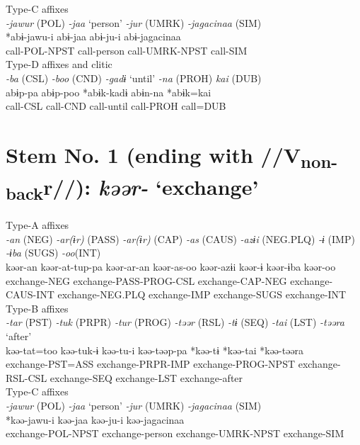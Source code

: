 \ex Type-C affixes\\
\glll \textit{-jawur} (POL)  \textit{-jaa} ‘person’  \textit{-jur} (UMRK)  \textit{-jagacinaa} (SIM)\\
*abɨ-jawu-i  abɨ-jaa  abɨ-ju-i  abɨ-jagacinaa\\
call-POL-NPST  call-person  call-UMRK-NPST  call-SIM\\


\ex Type-D affixes and clitic\\
\glll \textit{-ba} (CSL)  \textit{-boo} (CND)  \textit{-gadɨ} ‘until’  \textit{-na} (PROH)  \textit{kai} (DUB)\\
abɨp-pa  abɨp-poo  *abɨk-kadɨ  abɨn-na  *abɨk=kai\\
call-CSL  call-CND  call-until  call-PROH  call=DUB\\
\z

\section{Stem No. 1 (ending with //V\textsubscript{non-back}r//): \textit{kəər-} ‘exchange’}


\ea Type-A affixes\\
\glll \textit{-an} (NEG)  \textit{-ar(ɨr)} (PASS)  \textit{-ar(ɨr)} (CAP)  \textit{-as} (CAUS)  \textit{-azɨi} (NEG.PLQ)  \textit{-ɨ} (IMP)  \textit{-ɨba} (SUGS)  \textit{-oo}(INT)\\
kəər-an  kəər-at-tup-pa  kəər-ar-an  kəər-as-oo  kəər-azɨi  kəər-ɨ  kəər-ɨba  kəər-oo\\
exchange-NEG  exchange-PASS-PROG-CSL  exchange-CAP-NEG  exchange-CAUS-INT  exchange-NEG.PLQ  exchange-IMP  exchange-SUGS  exchange-INT\\


\ex Type-B affixes\\
\glll \textit{-tar} (PST)  \textit{-tuk} (PRPR)  \textit{-tur} (PROG)  \textit{-təər} (RSL)  \textit{-tɨ} (SEQ)  \textit{-tai} (LST)  \textit{-təəra} ‘after’\\
kəə-tat=too  kəə-tuk-ɨ  kəə-tu-i  kəə-təəp-pa  *kəə-tɨ  *kəə-tai  *kəə-təəra\\
exchange-PST=ASS  exchange-PRPR-IMP  exchange-PROG-NPST  exchange-RSL-CSL  exchange-SEQ  exchange-LST  exchange-after\\


\ex Type-C affixes\\
\glll \textit{-jawur} (POL)  \textit{-jaa} ‘person’  \textit{-jur} (UMRK)  \textit{-jagacinaa} (SIM)\\
*kəə-jawu-i  kəə-jaa  kəə-ju-i  kəə-jagacinaa\\
exchange-POL-NPST  exchange-person  exchange-UMRK-NPST  exchange-SIM\\


